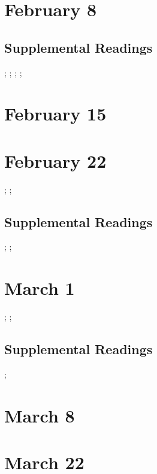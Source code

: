 \documentclass[11pt]{article}
\begin{document}
\section{February 8}

\cite{Strom:1992wx}

\subsection{Supplemental Readings}
\cite{Davies:1982vb}; \cite{Rakow:1992vx}; \cite{Pursell:1993td}; \cite{Tone:2001to}; \cite{Benson:1987wl}  

\section{February 15}

\cite{Hicks:2016uj}

\section{February 22}

\cite{Nakamura:2014gp}; \cite{Ensmenger:2010tc}; \cite{Haraway:1991uz}


\subsection{Supplemental Readings}

\cite{Ensmenger:2010te}; \cite{Milkman:1987tl}; \cite{Shetterly:2016vl}


\section{March 1}

\cite[][(selected excerpts)]{Levy:1984ut}; \cite{Eglash:2002wk}; \cite{Lagesen:2008vy}

\subsection{Supplemental Readings}

\cite{Kocurek:2015cg}; \cite{Losse:2012um}

\section{March 8}

\cite{Hayles:2008wq}


\section{March 22}
\end{document}
